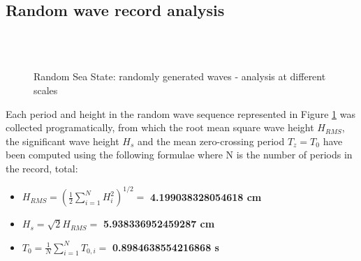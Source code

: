 \documentclass{article}
\begin{document}
	\subsection{Random wave record analysis}
	\begin{figure}[H]
		\centering
		\\
		\\
		\caption{Random Sea State: randomly generated waves - analysis at different scales}
		\label{randomgraph}
	\end{figure}
	Each period and height in the random wave sequence represented in Figure \ref{randomgraph} was collected programatically, from which the root mean square wave height $H_{RMS}$, the significant wave height $H_s$ and the mean zero-crossing period $T_z = T_0$ have been computed using the following formulae where N is the number of periods in the record, total:
	\begin{itemize}
		\item \( \displaystyle H_{RMS} = (\frac{1}{2}\sum_{i = 1}^{N}H_i^2)^{1/2} = \) \textbf{4.199038328054618 cm}
		\item \( \displaystyle H_s=\sqrt{2} H_{RMS} =\) \textbf{5.938336952459287 cm}
		\item \( \displaystyle T_0 = \frac{1}{N}\sum_{i = 1}^{N} T_{0,i} =\) \textbf{0.8984638554216868 s}
	\end{itemize}
\end{document}
